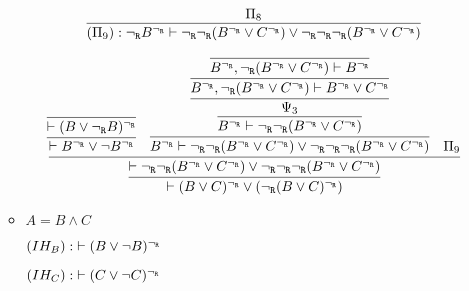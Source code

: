 \begin{enumerate}[(i)]
\begin{itemize}
            $$
                    \infer{
                        (\Pi_9) : {\neg_\R} B^{\neg_\R} \vdash {\neg_\R}{\neg_\R}(B^{\neg_\R} \vee C^{\neg_\R}) \vee {\neg_\R}{\neg_\R}{\neg_\R} (B^{\neg_\R} \vee C^{\neg_\R})
                    }{
                        \Pi_8
                    }
            $$

            $$
            \infer{
                \vdash (B \vee C)^{\neg_\R} \vee ({\neg_\R} (B \vee C)^{\neg_\R})
            }{
                \infer{
                    \vdash {\neg_\R}{\neg_\R}(B^{\neg_\R} \vee C^{\neg_\R}) \vee {\neg_\R}{\neg_\R}{\neg_\R} (B^{\neg_\R} \vee C^{\neg_\R})
                }{
                    \infer{
                        \vdash B^{\neg_\R} \vee \neg B^{\neg_\R}
                    }{
                        \infer{
                            \vdash (B \vee {\neg_\R} B)^{\neg_\R}
                        }{
                        }
                    }&
                    \infer{
                        B^{\neg_\R} \vdash {\neg_\R}{\neg_\R}(B^{\neg_\R} \vee C^{\neg_\R}) \vee {\neg_\R}{\neg_\R}{\neg_\R} (B^{\neg_\R} \vee C^{\neg_\R})
                    }{
                        \infer{
                            B^{\neg_\R} \vdash {\neg_\R}{\neg_\R}(B^{\neg_\R} \vee C^{\neg_\R})
                        }{
                            \infer{
                                \Psi_3
                            }{
                                \infer{
                                    B^{\neg_\R}, {\neg_\R}(B^{\neg_\R} \vee C^{\neg_\R}) \vdash B^{\neg_\R} \vee C^{\neg_\R}
                                }{
                                    \infer{
                                        B^{\neg_\R}, {\neg_\R}(B^{\neg_\R} \vee C^{\neg_\R}) \vdash B^{\neg_\R}
                                    }{
                                    }
                                }
                            }
                        }
                    }&
                    \Pi_9
                }
            }
            $$

        \item $A = B \wedge C$
        
            $(IH_B) : \; \vdash (B \vee \neg B)^{\neg_{\texttt{R}}}$
            
            $(IH_C) : \; \vdash (C \vee \neg C)^{\neg_{\texttt{R}}}$



\end{itemize}
\end{enumerate}
